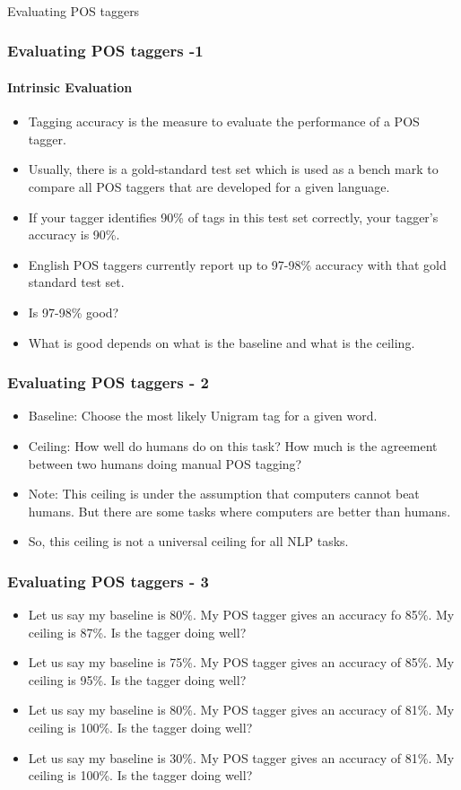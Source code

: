 \documentclass{beamer}
\begin{document}
\begin{frame}
\frametitle{}
\begin{center}
\Large Evaluating POS taggers
\end{center}
\end{frame}

\begin{frame}
\frametitle{Evaluating POS taggers -1}
\framesubtitle{Intrinsic Evaluation}
\begin{itemize}
\item Tagging accuracy is the measure to evaluate the performance of a POS tagger.
\item Usually, there is a gold-standard test set which is used as a bench mark to compare all POS taggers that are developed for a given language.
\item If your tagger identifies 90\% of tags in this test set correctly, your tagger's accuracy is 90\%.
\item English POS taggers currently report up to 97-98\% accuracy with that gold standard test set.
\item Is 97-98\% good? \pause
\item What is good depends on what is the baseline and what is the ceiling.
\end{itemize}
\end{frame}

\begin{frame}
\frametitle{Evaluating POS taggers - 2}
\begin{itemize}
\item Baseline: Choose the most likely Unigram tag for a given word.
\item Ceiling: How well do humans do on this task? How much is the agreement between two humans doing manual POS tagging?
\item Note: This ceiling is under the assumption that computers cannot beat humans. But there are some tasks where computers are better than humans. 
\item So, this ceiling is not a universal ceiling for all NLP tasks.
\end{itemize}
\end{frame}

\begin{frame}
\frametitle{Evaluating POS taggers - 3}
\begin{itemize}
\item Let us say my baseline is 80\%. My POS tagger gives an accuracy fo 85\%. My ceiling is 87\%. Is the tagger doing well? \pause
\item Let us say my baseline is 75\%. My POS tagger gives an accuracy of 85\%. My ceiling is 95\%. Is the tagger doing well? \pause
\item Let us say my baseline is 80\%. My POS tagger gives an accuracy of 81\%. My ceiling is 100\%. Is the tagger doing well? \pause
\item Let us say my baseline is 30\%. My POS tagger gives an accuracy of 81\%. My ceiling is 100\%. Is the tagger doing well? 
\end{itemize}
\end{frame}
\end{document}
